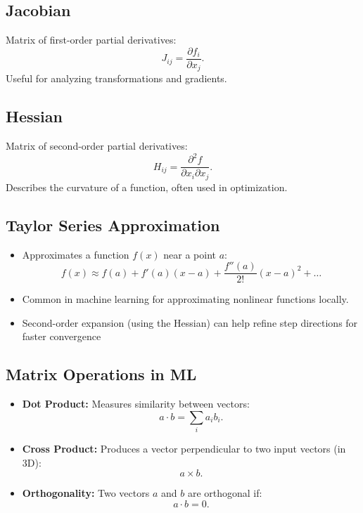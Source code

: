 \documentclass[12pt,a4paper]{article}
\begin{document}
\subsection{Jacobian} Matrix of first-order partial derivatives:
    \[ J_{ij} = \frac{\partial f_i}{\partial x_j}. \]
    Useful for analyzing transformations and gradients.
\subsection{Hessian} Matrix of second-order partial derivatives:
    \[ H_{ij} = \frac{\partial^2 f}{\partial x_i \partial x_j}. \]
    Describes the curvature of a function, often used in optimization.

\subsection{Taylor Series Approximation}
\begin{itemize}
    \item Approximates a function $f(x)$ near a point $a$:
    \[ f(x) \approx f(a) + f'(a)(x-a) + \frac{f''(a)}{2!}(x-a)^2 + \dots \]
    \item Common in machine learning for approximating nonlinear functions locally.
    \item Second-order expansion (using the Hessian) can help refine step directions for faster convergence
\end{itemize}

\subsection{Matrix Operations in ML}
\begin{itemize}
    \item \textbf{Dot Product:} Measures similarity between vectors:
    \[ a \cdot b = \sum_{i} a_i b_i. \]
    \item \textbf{Cross Product:} Produces a vector perpendicular to two input vectors (in 3D):
    \[ a \times b. \]
    \item \textbf{Orthogonality:} Two vectors $a$ and $b$ are orthogonal if:
    \[ a \cdot b = 0. \]
\end{itemize}
\end{document}
